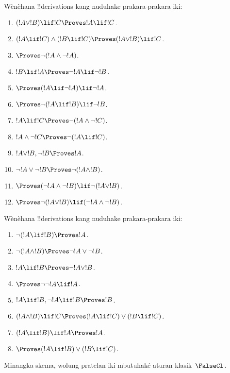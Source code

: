 \documentclass[../../../include/open-logic-section]{subfiles}
\begin{document}
\begin{prob}
Wènèhana !!{derivation}s kang nuduhake prakara-prakara iki:
\begin{enumerate}
\item $(!A \lor !B) \lif !C \Proves !A \lif !C$.
\item $(!A \lif !C) \land (!B \lif !C) \Proves (!A \lor !B) \lif !C$.
\item $\Proves \lnot(!A \land \lnot !A)$.
\item $!B \lif !A \Proves \lnot !A \lif \lnot !B$.
\item $\Proves (!A \lif \lnot !A) \lif \lnot !A$.
\item $\Proves \lnot(!A \lif !B) \lif \lnot !B$.
\item $!A \lif !C \Proves \lnot (!A \land \lnot !C)$.
\item $!A \land \lnot !C \Proves \lnot (!A \lif !C)$.
\item $!A \lor !B, \lnot !B \Proves !A$.
\item $\lnot !A \lor \lnot !B \Proves \lnot(!A \land !B)$.
\item $\Proves (\lnot !A \land \lnot !B) \lif\lnot(!A \lor !B)$.
\item $\Proves \lnot(!A \lor !B) \lif (\lnot !A \land \lnot !B)$.
\end{enumerate}
\end{prob}

\begin{prob}
Wènèhana !!{derivation}s kang nuduhake prakara-prakara iki:
\begin{enumerate}
\item $\lnot(!A \lif !B) \Proves !A$.
\item $\lnot(!A \land !B) \Proves \lnot !A \lor \lnot !B$.
\item $!A \lif !B \Proves \lnot !A \lor !B$.
\item $\Proves \lnot \lnot !A \lif !A$.
\item $!A \lif !B, \lnot !A \lif !B \Proves !B$.
\item $(!A \land !B) \lif !C \Proves (!A \lif !C) \lor (!B \lif !C)$.
\item $(!A \lif !B) \lif !A \Proves !A$.
\item $\Proves (!A \lif !B) \lor (!B \lif !C)$.
\end{enumerate}
Minangka skema, wolung pratelan iki mbutuhaké aturan klasik~$\FalseCl$.
\end{prob}
\end{document}
